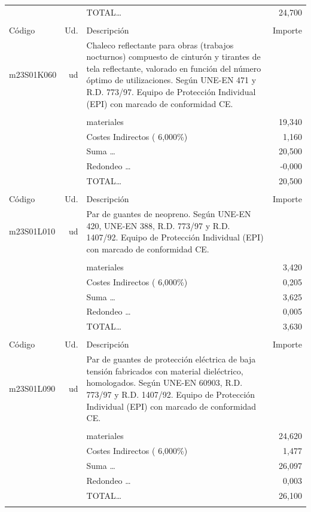 \begin{supertabular}{l r p{60mm} r}
%
&&TOTAL\ldots&    24,700\\%
&&&\\%
Código&Ud.&Descripción&Importe\\%
\hline%
m23S01K060&ud&Chaleco reflectante para obras (trabajos nocturnos) compuesto de cinturón y tirantes de tela reflectante, valorado en función del número óptimo de utilizaciones. Según UNE{-}EN 471 y R.D. 773/97. Equipo de Protección Individual (EPI) con marcado de conformidad CE.&\\%
&&&\\%
&&materiales&    19,340\\%
&&Costes Indirectos (     6,000\%)&     1,160\\%
&&Suma \ldots&    20,500\\%
&&Redondeo \ldots&    {-}0,000\\%
%
&&TOTAL\ldots&    20,500\\%
&&&\\%
Código&Ud.&Descripción&Importe\\%
\hline%
m23S01L010&ud&Par de guantes de neopreno. Según UNE{-}EN 420, UNE{-}EN 388, R.D. 773/97 y R.D. 1407/92. Equipo de Protección Individual (EPI) con marcado de conformidad CE.&\\%
&&&\\%
&&materiales&     3,420\\%
&&Costes Indirectos (     6,000\%)&     0,205\\%
&&Suma \ldots&     3,625\\%
&&Redondeo \ldots&     0,005\\%
%
&&TOTAL\ldots&     3,630\\%
&&&\\%
Código&Ud.&Descripción&Importe\\%
\hline%
m23S01L090&ud&Par de guantes de protección eléctrica de baja tensión fabricados con material dieléctrico, homologados. Según UNE{-}EN 60903, R.D. 773/97 y R.D. 1407/92. Equipo de Protección Individual (EPI) con marcado de conformidad CE.&\\%
&&&\\%
&&materiales&    24,620\\%
&&Costes Indirectos (     6,000\%)&     1,477\\%
&&Suma \ldots&    26,097\\%
&&Redondeo \ldots&     0,003\\%
%
&&TOTAL\ldots&    26,100\\%
&&&\\%

\end{supertabular}
